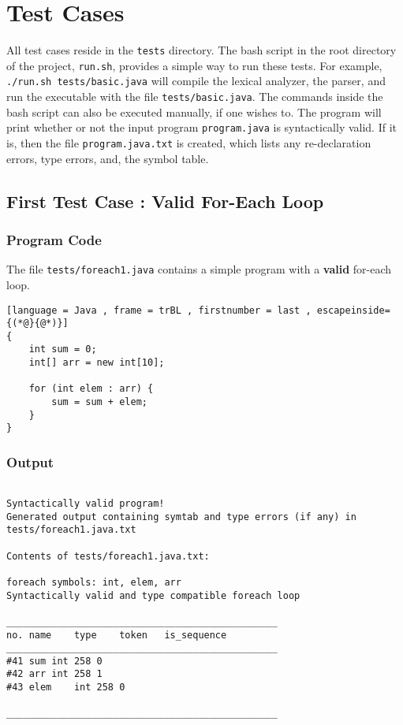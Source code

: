 \documentclass{article}
\begin{document}
\section{Test Cases}

All test cases reside in the \texttt{tests} directory. The bash script in the root directory of the project, \texttt{run.sh}, provides a simple way to run these tests. For example, \texttt{./run.sh tests/basic.java} will compile the lexical analyzer, the parser, and run the executable with the file \texttt{tests/basic.java}. The commands inside the bash script can also be executed manually, if one wishes to. The program will print whether or not the input program \texttt{program.java} is syntactically valid. If it is, then the file \texttt{program.java.txt} is created, which lists any re-declaration errors, type errors, and, the symbol table.

\subsection{First Test Case : Valid For-Each Loop}

\subsubsection{Program Code}
The file \texttt{tests/foreach1.java} contains a simple program with a \textbf{valid} for-each loop.
\begin{lstlisting}[language = Java , frame = trBL , firstnumber = last , escapeinside={(*@}{@*)}]
{
    int sum = 0;
    int[] arr = new int[10];
    
    for (int elem : arr) {
        sum = sum + elem;
    }
}

\end{lstlisting}

\subsubsection{Output}
\begin{lstlisting}

Syntactically valid program!
Generated output containing symtab and type errors (if any) in tests/foreach1.java.txt

Contents of tests/foreach1.java.txt:

foreach symbols: int, elem, arr
Syntactically valid and type compatible foreach loop

________________________________________________
no.	name	type	token	is_sequence
________________________________________________
#41	sum	int	258	0
#42	arr	int	258	1
#43	elem	int	258	0

________________________________________________


\end{lstlisting}
\end{document}
